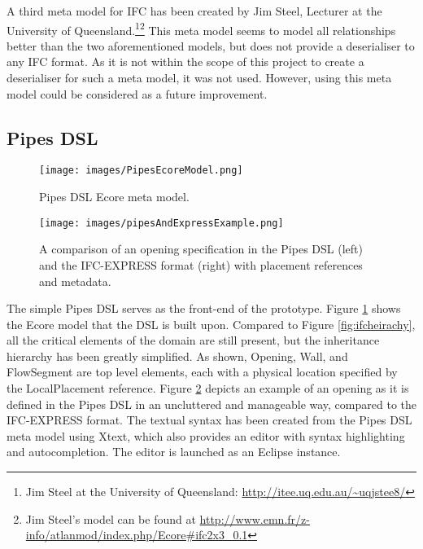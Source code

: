 A third meta model for IFC has been created by Jim Steel, Lecturer at the University of Queensland.\footnote{Jim Steel at the University of Queensland: \url{http://itee.uq.edu.au/~uqjstee8/}}\footnote{Jim Steel's model can be found at \url{http://www.emn.fr/z-info/atlanmod/index.php/Ecore#ifc2x3_0.1}} This meta model seems to model all relationships better than the two aforementioned models, but does not provide a deserialiser to any IFC format. As it is not within the scope of this project to create a deserialiser for such a meta model, it was not used. However, using this meta model could be considered as a future improvement.

\subsection{Pipes DSL}
\label{subsec:pipes_dsl}

\begin{figure}[t]
    \centering
        \texttt{[image: images/PipesEcoreModel.png]}
    \caption{Pipes DSL Ecore meta model.}
    \label{fig:pipes_dsl_ecore_model}
\end{figure}

\begin{figure}[t]
    \centering
        \texttt{[image: images/pipesAndExpressExample.png]}
    \caption{A comparison of an opening specification in the Pipes DSL (left) and the IFC-EXPRESS format (right) with placement references and metadata.}
    \label{fig:pipes_express_comparison}
\end{figure}

The simple Pipes DSL serves as the front-end of the prototype. Figure \ref{fig:pipes_dsl_ecore_model} shows the Ecore model that the DSL is built upon. Compared to Figure \ref{fig:ifcheirachy}, all the critical elements of the domain are still present, but the inheritance hierarchy has been greatly simplified. As shown, Opening, Wall, and FlowSegment are top level elements, each with a physical location specified by the LocalPlacement reference. Figure \ref{fig:pipes_express_comparison} depicts an example of an opening as it is defined in the Pipes DSL in an uncluttered and manageable way, compared to the IFC-EXPRESS format. The textual syntax has been created from the Pipes DSL meta model using Xtext, which also provides an editor with syntax highlighting and autocompletion. The editor is launched as an Eclipse instance.


